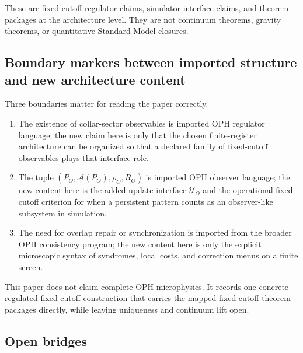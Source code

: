 \documentclass[11pt]{article}
\begin{document}
These are fixed-cutoff regulator claims, simulator-interface claims, and theorem packages at the
architecture level. They are not continuum
theorems, gravity theorems, or quantitative Standard Model closures.

\subsection{Boundary markers between imported structure and new architecture content}

Three boundaries matter for reading the paper correctly.
\begin{enumerate}[leftmargin=2em]
\item The existence of collar-sector observables is imported OPH regulator language; the new
claim here is only that the chosen finite-register architecture can be organized so that a
declared family of fixed-cutoff observables plays that interface role.
\item The tuple $(P_O,\mathcal A(P_O),\rho_O,R_O)$ is imported OPH observer language; the new
content here is the added update interface $\mathcal U_O$ and the operational fixed-cutoff criterion
for when a persistent pattern counts as an observer-like subsystem in simulation.
\item The need for overlap repair or synchronization is imported from the broader OPH consistency
program; the new content here is only the explicit microscopic syntax of syndromes, local costs,
and correction menus on a finite screen.
\end{enumerate}

This paper does not claim complete OPH microphysics. It records one concrete regulated
fixed-cutoff construction that carries the mapped fixed-cutoff theorem packages directly, while
leaving uniqueness and continuum lift open.

\subsection{Open bridges}
\end{document}
